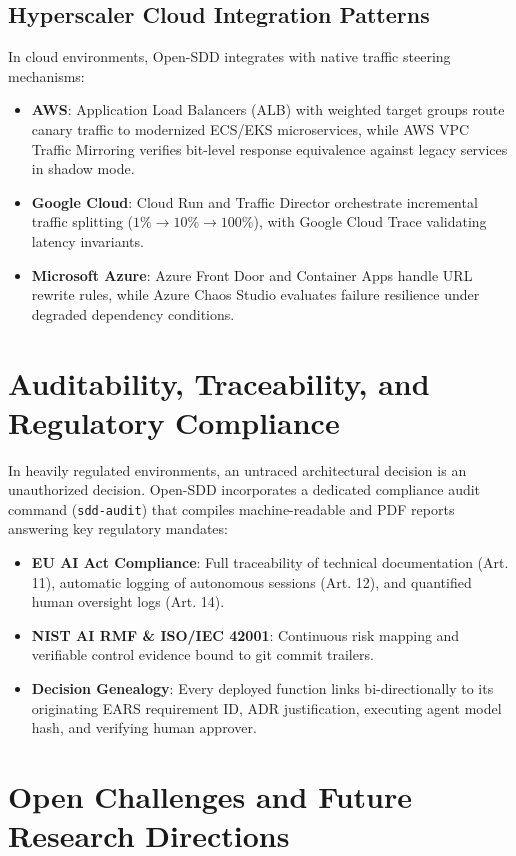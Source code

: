 \documentclass[11pt,a4paper]{article}
\begin{document}
\subsection{Hyperscaler Cloud Integration Patterns}
In cloud environments, Open-SDD integrates with native traffic steering mechanisms:
\begin{itemize}
    \item \textbf{AWS}: Application Load Balancers (ALB) with weighted target groups route canary traffic to modernized ECS/EKS microservices, while AWS VPC Traffic Mirroring verifies bit-level response equivalence against legacy services in shadow mode.
    \item \textbf{Google Cloud}: Cloud Run and Traffic Director orchestrate incremental traffic splitting ($1\% \to 10\% \to 100\%$), with Google Cloud Trace validating latency invariants.
    \item \textbf{Microsoft Azure}: Azure Front Door and Container Apps handle URL rewrite rules, while Azure Chaos Studio evaluates failure resilience under degraded dependency conditions.
\end{itemize}

\section{Auditability, Traceability, and Regulatory Compliance}

In heavily regulated environments, an untraced architectural decision is an unauthorized decision. Open-SDD incorporates a dedicated compliance audit command (\texttt{sdd-audit}) that compiles machine-readable and PDF reports answering key regulatory mandates:
\begin{itemize}
    \item \textbf{EU AI Act Compliance}: Full traceability of technical documentation (Art. 11), automatic logging of autonomous sessions (Art. 12), and quantified human oversight logs (Art. 14).
    \item \textbf{NIST AI RMF \& ISO/IEC 42001}: Continuous risk mapping and verifiable control evidence bound to git commit trailers.
    \item \textbf{Decision Genealogy}: Every deployed function links bi-directionally to its originating EARS requirement ID, ADR justification, executing agent model hash, and verifying human approver.
\end{itemize}

\section{Open Challenges and Future Research Directions}
\end{document}
